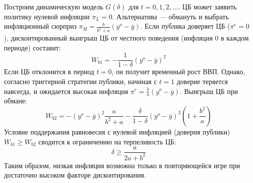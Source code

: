 \begin{example}
Построим динамическую модель $G(\delta)$ для $t = 0, 1, 2, \dots$. ЦБ может заявить политику нулевой инфляции $\pi_L = 0$. Альтернатива — обмануть и выбрать инфляционный сюрприз $\pi_H = \frac{b}{b^2 + a}(y^o - \bar{y})$.
Если публика доверяет ЦБ ($\pi^e = 0$), дисконтированный выигрыш ЦБ от честного поведения (инфляция 0 в каждом периоде) составит:
\begin{equation}
    W_{b1} = -\frac{1}{1 - \delta}(y^o - \bar{y})^2
\end{equation}
Если ЦБ отклонится в период $t=0$, он получит временный рост ВВП. Однако, согласно триггерной стратегии публики, начиная с $t=1$ доверие теряется навсегда, и ожидается высокая инфляция $\pi^e = \frac{b}{a}(y^o - \bar{y})$. Выигрыш ЦБ при обмане:
\begin{equation}
    W_{b2} = -(y^o - \bar{y})^2 \frac{a}{b^2 + a} - \frac{\delta}{1 - \delta}(y^o - \bar{y})^2 \left( 1 + \frac{b^2}{a} \right)
\end{equation}
Условие поддержания равновесия с нулевой инфляцией (доверия публики) $W_{b1} \ge W_{b2}$ сводится к ограничению на терпеливость ЦБ:
\begin{equation}
    \delta \ge \frac{a}{2a + b^2}
\end{equation}
Таким образом, низкая инфляция возможна только в повторяющейся игре при достаточно высоком факторе дисконтирования.
\end{example}
